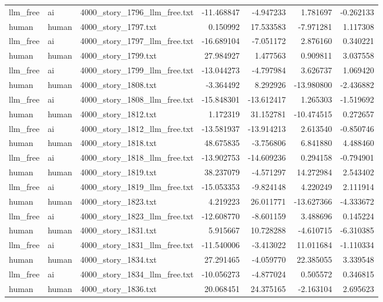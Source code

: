 \begin{longtable}{lllrrrr}
llm\_free & ai & 4000\_story\_1796\_llm\_free.txt & -11.468847 & -4.947233 & 1.781697 & -0.262133 \\
human & human & 4000\_story\_1797.txt & 0.150992 & 17.533583 & -7.971281 & 1.117308 \\
llm\_free & ai & 4000\_story\_1797\_llm\_free.txt & -16.689104 & -7.051172 & 2.876160 & 0.340221 \\
human & human & 4000\_story\_1799.txt & 27.984927 & 1.477563 & 0.909811 & 3.037558 \\
llm\_free & ai & 4000\_story\_1799\_llm\_free.txt & -13.044273 & -4.797984 & 3.626737 & 1.069420 \\
human & human & 4000\_story\_1808.txt & -3.364492 & 8.292926 & -13.980800 & -2.436882 \\
llm\_free & ai & 4000\_story\_1808\_llm\_free.txt & -15.848301 & -13.612417 & 1.265303 & -1.519692 \\
human & human & 4000\_story\_1812.txt & 1.172319 & 31.152781 & -10.474515 & 0.272657 \\
llm\_free & ai & 4000\_story\_1812\_llm\_free.txt & -13.581937 & -13.914213 & 2.613540 & -0.850746 \\
human & human & 4000\_story\_1818.txt & 48.675835 & -3.756806 & 6.841880 & 4.488460 \\
llm\_free & ai & 4000\_story\_1818\_llm\_free.txt & -13.902753 & -14.609236 & 0.294158 & -0.794901 \\
human & human & 4000\_story\_1819.txt & 38.237079 & -4.571297 & 14.272984 & 2.543402 \\
llm\_free & ai & 4000\_story\_1819\_llm\_free.txt & -15.053353 & -9.824148 & 4.220249 & 2.111914 \\
human & human & 4000\_story\_1823.txt & 4.219223 & 26.011771 & -13.627366 & -4.333672 \\
llm\_free & ai & 4000\_story\_1823\_llm\_free.txt & -12.608770 & -8.601159 & 3.488696 & 0.145224 \\
human & human & 4000\_story\_1831.txt & 5.915667 & 10.728288 & -4.610715 & -6.310385 \\
llm\_free & ai & 4000\_story\_1831\_llm\_free.txt & -11.540006 & -3.413022 & 11.011684 & -1.110334 \\
human & human & 4000\_story\_1834.txt & 27.291465 & -4.059770 & 22.385055 & 3.339548 \\
llm\_free & ai & 4000\_story\_1834\_llm\_free.txt & -10.056273 & -4.877024 & 0.505572 & 0.346815 \\
human & human & 4000\_story\_1836.txt & 20.068451 & 24.375165 & -2.163104 & 2.695623 \\

\end{longtable}
